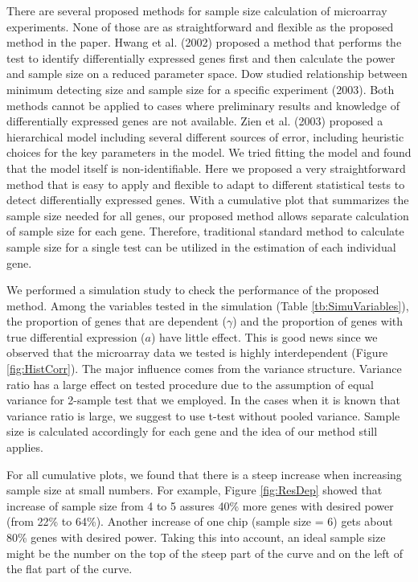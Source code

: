 \documentclass{bioinfo}
\begin{document}
There are several proposed methods for sample size calculation of
microarray experiments. None of those are as straightforward and
flexible as the proposed method in the paper. Hwang et al. (2002)
proposed a method that performs the test to identify
differentially expressed genes first and then calculate the power
and sample size on a reduced parameter space. Dow studied
relationship between minimum detecting size and sample size for a
specific experiment (2003). Both methods cannot be applied to
cases where preliminary results and knowledge of differentially
expressed genes are not available. Zien et al. (2003) proposed a
hierarchical model including several different sources of error,
including heuristic choices for the key parameters in the model.
We tried fitting the model and found that the model itself is
non-identifiable. Here we proposed a very straightforward method
that is easy to apply and flexible to adapt to different
statistical tests to detect differentially expressed genes. With a
cumulative plot that summarizes the sample size needed for all
genes, our proposed method allows separate calculation of sample
size for each gene. Therefore, traditional standard method to
calculate sample size for a single test can be utilized in the
estimation of each individual gene.

We performed a simulation study to check the performance of the
proposed method. Among the variables tested in the simulation
(Table \ref{tb:SimuVariables}), the proportion of genes that are
dependent ($\gamma$) and the proportion of genes with true
differential expression ($a$) have little effect. This is good
news since we observed that the microarray data we tested is
highly interdependent (Figure \ref{fig:HistCorr}). The major
influence comes from the variance structure. Variance ratio has a
large effect on tested procedure due to the assumption of equal
variance for 2-sample test that we employed. In the cases when it
is known that variance ratio is large, we suggest to use t-test
without pooled variance. Sample size is calculated accordingly for
each gene and the idea of our method still applies.

For all cumulative plots, we found that there is a steep increase
when increasing sample size at small numbers. For example, Figure
\ref{fig:ResDep} showed that increase of sample size from 4 to 5
assures 40\% more genes with desired power (from 22\% to 64\%).
Another increase of one chip (sample size = 6) gets about 80\%
genes with desired power. Taking this into account, an ideal
sample size might be the number on the top of the steep part of
the curve and on the left of the flat part of the curve.
\end{document}
